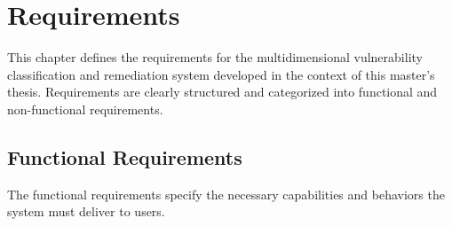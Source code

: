 \chapter{Requirements}
\label{chapter:requirements}

This chapter defines the requirements for the multidimensional vulnerability classification and remediation system developed in the context of this master's thesis. Requirements are clearly structured and categorized into functional and non-functional requirements.

\section{Functional Requirements}
The functional requirements specify the necessary capabilities and behaviors the system must deliver to users.

